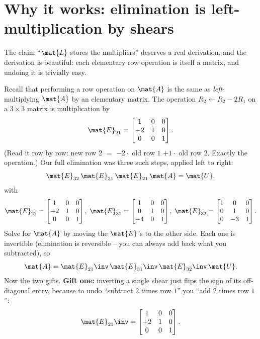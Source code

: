 \section{Why it works: elimination is left-multiplication by shears}
\label{ch09:why-it-works}

The claim ``$\mat{L}$ stores the multipliers'' deserves a real derivation, and the
derivation is beautiful: each elementary row operation is itself a matrix, and undoing it
is trivially easy.

Recall that performing a row operation on $\mat{A}$ is the same as \emph{left}-multiplying
$\mat{A}$ by an elementary matrix. The operation $R_2 \leftarrow R_2 - 2R_1$ on a
$3\times 3$ matrix is multiplication by
\[
  \mat{E}_{21} = \begin{bmatrix} 1 & 0 & 0 \\ -2 & 1 & 0 \\ 0 & 0 & 1 \end{bmatrix}.
\]
(Read it row by row: new row $2$ $=$ $-2\cdot$ old row $1$ $+1\cdot$ old row $2$. Exactly
the operation.) Our full elimination was three such steps, applied left to right:
\[
  \mat{E}_{32}\,\mat{E}_{31}\,\mat{E}_{21}\,\mat{A} = \mat{U},
\]
with
\[
  \mat{E}_{21} = \begin{bmatrix} 1&0&0\\-2&1&0\\0&0&1 \end{bmatrix},\;
  \mat{E}_{31} = \begin{bmatrix} 1&0&0\\0&1&0\\-4&0&1 \end{bmatrix},\;
  \mat{E}_{32} = \begin{bmatrix} 1&0&0\\0&1&0\\0&-3&1 \end{bmatrix}.
\]
Solve for $\mat{A}$ by moving the $\mat{E}$'s to the other side. Each one is invertible
(elimination is reversible -- you can always add back what you subtracted), so
\[
  \mat{A} = \mat{E}_{21}\inv\,\mat{E}_{31}\inv\,\mat{E}_{32}\inv\,\mat{U}.
\]
Now the two gifts. \textbf{Gift one:} inverting a single shear just flips the sign of its
off-diagonal entry, because to undo ``subtract $2$ times row $1$'' you ``add $2$ times row
$1$'':
\[
  \mat{E}_{21}\inv = \begin{bmatrix} 1&0&0\\ +2&1&0\\0&0&1 \end{bmatrix}.
\]
